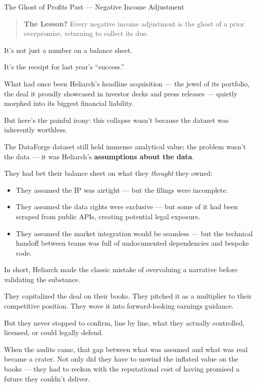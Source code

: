 \begin{HistoricalSidebar}{The Ghost of Profits Past --- Negative Income Adjustment}
  \medskip
  
  \begin{quote}
  \textbf{The Lesson?} Every negative income adjustment is the ghost of a prior overpromise, returning to collect its due.
  \end{quote}
  
  It’s not just a number on a balance sheet.  
  
  \medskip
  
  It’s the receipt for last year’s “success.”
  
\end{HistoricalSidebar}

\medskip

What had once been Heliarch’s headline acquisition — the jewel of its portfolio, the deal it proudly showcased in investor decks and press releases — quietly morphed into its biggest financial liability.

But here’s the painful irony:
this collapse wasn’t because the dataset was inherently worthless.

The DataForge dataset still held immense analytical value; the problem wasn’t the data — it was Heliarch’s \textbf{assumptions about the data}.

They had bet their balance sheet on what they \textit{thought} they owned:

\begin{itemize}
\item They assumed the IP was airtight — but the filings were incomplete.
\item They assumed the data rights were exclusive — but some of it had been scraped from public APIs, creating potential legal exposure.
\item They assumed the market integration would be seamless — but the technical handoff between teams was full of undocumented dependencies and bespoke code.
\end{itemize}

In short, Heliarch made the classic mistake of overvaluing a narrative before validating the substance.

They capitalized the deal on their books.
They pitched it as a multiplier to their competitive position.
They wove it into forward-looking earnings guidance.

But they never stopped to confirm, line by line, what they actually controlled, licensed, or could legally defend.

When the audits came, that gap between what was assumed and what was real became a crater.
Not only did they have to unwind the inflated value on the books —
they had to reckon with the reputational cost of having promised a future they couldn’t deliver.

